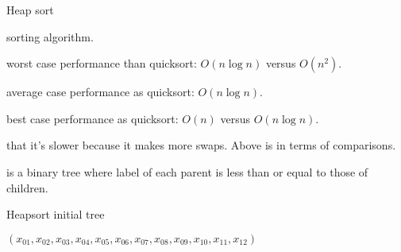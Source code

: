 \documentclass{beamer}
\begin{document}
\begin{frame}{Heap sort}
  \begin{description}
    \setlength\itemsep{4mm}
    \item[Comparison] sorting algorithm.
    \item[Better] worst case performance than quicksort: \(O(n \log n)\) versus \(O(n^2)\).
    \item[Same] average case performance as quicksort: \(O(n \log n)\).
    \item[Better] best case performance as quicksort: \(O(n)\) versus \( O(n \log n) \).
    \item[Claims] that it's slower because it makes more swaps. Above is in terms of comparisons.
    \item[Heap] is a binary tree where label of each parent is less than or equal to those of children.
  \end{description}
\end{frame}

\begin{frame}[fragile]{Heapsort initial tree}
  \begin{center}
    $(x_{01},x_{02},x_{03},x_{04},x_{05},x_{06},x_{07},x_{08},x_{09},x_{10},x_{11},x_{12})$ \\[1cm]
  \end{center}
\end{frame}
\end{document}

